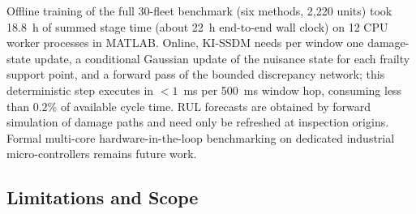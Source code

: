 \documentclass[a4paper,fleqn]{cas-dc}
\begin{document}
Offline training of the full 30-fleet benchmark (six methods, 2,220 units) took 18.8~h of summed stage time (about 22~h end-to-end wall clock) on 12 CPU worker processes in MATLAB. Online, KI-SSDM needs per window one damage-state update, a conditional Gaussian update of the nuisance state for each frailty support point, and a forward pass of the bounded discrepancy network; this deterministic step executes in $<1$~ms per 500~ms window hop, consuming less than $0.2\%$ of available cycle time. RUL forecasts are obtained by forward simulation of damage paths and need only be refreshed at inspection origins. Formal multi-core hardware-in-the-loop benchmarking on dedicated industrial micro-controllers remains future work.
\subsection{Limitations and Scope}
\label{subsec:limitations}
\end{document}
